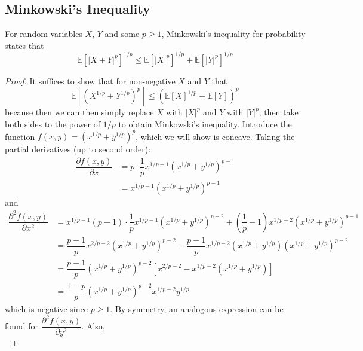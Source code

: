 \documentclass[11pt]{report} %
\begin{document}
\subsection{Minkowski's Inequality}

For random variables $X$, $Y$ and some $p \geq 1$, Minkowski's inequality for probability states that
\begin{equation}
\mathbb{E}\left[\left|X + Y\right|^{p}\right]^{1/p} \leq \mathbb{E}\left[\left|X\right|^{p}\right]^{1/p} + \mathbb{E}\left[\left|Y\right|^{p}\right]^{1/p}
\end{equation}
\begin{proof}
It suffices to show that for non-negative $X$ and $Y$ that
\begin{equation}
\mathbb{E}\left[\left(X^{1/p} + Y^{1/p}\right)^{p}\right] \leq \left(\mathbb{E}\left[X\right]^{1/p} + \mathbb{E}\left[Y\right]\right)^{p}
\end{equation}
because then we can then simply replace $X$ with $\left|X\right|^{p}$ and $Y$ with $\left|Y\right|^{p}$, then take both sides to the power of $1/p$ to obtain Minkowski's inequality. Introduce the function $f\left(x, y\right) = \left(x^{1/p} + y^{1/p}\right)^{p}$, which we will show is concave. Taking the partial derivatives (up to second order):
\begin{align}
\dfrac{\partial f\left(x,y\right)}{\partial x} &= p\cdot\dfrac{1}{p}x^{1/p-1}\left(x^{1/p}+y^{1/p}\right)^{p-1} \\
&= x^{1/p-1}\left(x^{1/p}+y^{1/p}\right)^{p-1}
\end{align}
and
\begin{align}
\dfrac{\partial^{2}f\left(x,y\right)}{\partial x^{2}} &= x^{1/p-1}\left(p-1\right)\cdot\dfrac{1}{p}x^{1/p-1}\left(x^{1/p}+y^{1/p}\right)^{p-2}+\left(\dfrac{1}{p}-1\right)x^{1/p-2}\left(x^{1/p}+y^{1/p}\right)^{p-1} \\
&= \dfrac{p-1}{p}x^{2/p-2}\left(x^{1/p}+y^{1/p}\right)^{p-2}-\dfrac{p-1}{p}x^{1/p-2}\left(x^{1/p}+y^{1/p}\right)\left(x^{1/p}+y^{1/p}\right)^{p-2} \\
&= \dfrac{p-1}{p}\left(x^{1/p}+y^{1/p}\right)^{p-2}\left[x^{2/p-2}-x^{1/p-2}\left(x^{1/p}+y^{1/p}\right)\right] \\
&= \dfrac{1-p}{p}\left(x^{1/p}+y^{1/p}\right)^{p-2}x^{1/p-2}y^{1/p}
\end{align}
which is negative since $p \geq 1$. By symmetry, an analogous expression can be found for $\dfrac{\partial^{2}f\left(x,y\right)}{\partial y^{2}}$. Also,
\begin{equation}

\end{equation}
\end{proof}
\end{document}
